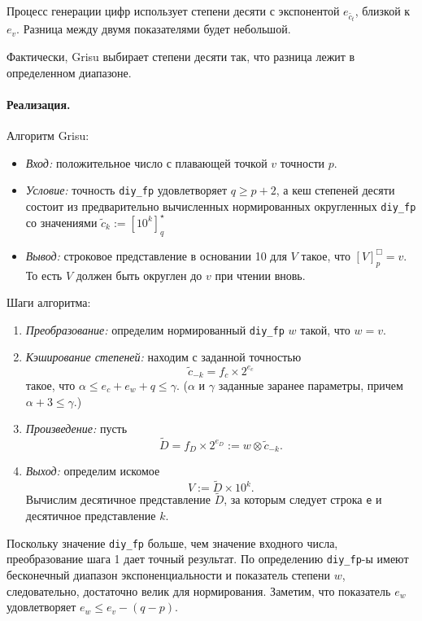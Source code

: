 \documentclass[specialist,subf,href,colorlinks=true,14pt
,times,mtpro,specialist
]{disser}
\begin{document}
Процесс генерации цифр использует степени десяти с экспонентой $e_{\tilde{c_t}}$, близкой к $e_v$. 
Разница между двумя показателями будет небольшой.

Фактически, \textsf{Grisu} выбирает степени десяти так, что разница лежит в определенном диапазоне. 

\paragraph{Реализация.}
Алгоритм \textsf{Grisu}: \begin{itemize}
\item \textit{Вход:} положительное число с плавающей точкой $v$ точности $p$.
\item \textit{Условие:} точность \texttt{diy\_fp} удовлетворяет $q \geqslant p + 2$, а кеш степеней десяти состоит из предварительно вычисленных нормированных округленных  \texttt{diy\_fp} со значениями $\tilde{c}_k := \left[ 10^k \right]_q^{\star}$
\item \textit{Вывод:} строковое представление в основании 10 для $V$ такое, что $[V]^{\Box}_p = v$. 
То есть $V$ должен быть округлен до $v$ при чтении вновь.
\end{itemize}

Шаги алгоритма:
\begin{enumerate}
\item \textit{Преобразование:} определим нормированный \texttt{diy\_fp} $w$ такой, что $w = v$.
\item \textit{Кэширование степеней:} находим с заданной точностью $$\tilde{c}_{-k} = f_c \times 2^{e_c}$$ такое, что $\alpha \leqslant e_c + e_w + q \leqslant \gamma$. ($\alpha$ и $\gamma$ заданные заранее параметры, причем $\alpha + 3 \leqslant \gamma$.) 
\item \textit{Произведение:} пусть $$\tilde{D} = f_D \times 2^{e_D} := w \otimes \tilde{c}_{-k}.$$
\item \textit{Выход:} определим искомое $$V := \tilde{D} \times 10^k.$$ 
Вычислим десятичное представление $\tilde{D}$, за которым следует строка \texttt{e} и десятичное представление $k$.
\end{enumerate}
Поскольку значение \texttt{diy\_fp} больше, чем значение входного числа, преобразование шага 1 дает точный результат. 
По определению \texttt{diy\_fp}-ы имеют бесконечный диапазон экспоненциальности и показатель степени $w$, следовательно, достаточно велик для нормирования. 
Заметим, что показатель $e_w$ удовлетворяет $e_w \leqslant e_v - (q - p)$. 
\end{document}
